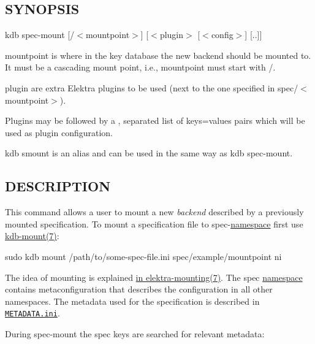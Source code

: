 \subsection*{S\+Y\+N\+O\+P\+S\+IS}

{\ttfamily kdb spec-\/mount \mbox{[}/$<$mountpoint$>$\mbox{]} \mbox{[}$<$plugin$>$ \mbox{[}$<$config$>$\mbox{]} \mbox{[}..\mbox{]}\mbox{]}}


\begin{DoxyItemize}
\item {\ttfamily mountpoint} is where in the key database the new backend should be mounted to. It must be a cascading mount point, i.\+e., {\ttfamily mountpoint} must start with {\ttfamily /}.
\item {\ttfamily plugin} are extra Elektra plugins to be used (next to the one specified in {\ttfamily spec/$<$mountpoint$>$}).
\item Plugins may be followed by a {\ttfamily ,} separated list of {\ttfamily keys=values} pairs which will be used as plugin configuration.
\end{DoxyItemize}

{\ttfamily kdb smount} is an alias and can be used in the same way as {\ttfamily kdb spec-\/mount}.

\subsection*{D\+E\+S\+C\+R\+I\+P\+T\+I\+ON}

This command allows a user to mount a new {\itshape backend} described by a previously mounted specification. To mount a specification file to {\ttfamily spec}-\/\hyperlink{doc_help_elektra-namespaces_md}{namespace} first use \hyperlink{doc_help_kdb-mount_md}{kdb-\/mount(7)}\+:


\begin{DoxyCode}
sudo kdb mount /path/to/some-spec-file.ini spec/example/mountpoint ni
\end{DoxyCode}


The idea of mounting is explained \hyperlink{doc_help_elektra-mounting_md}{in elektra-\/mounting(7)}. The {\ttfamily spec} \hyperlink{doc_help_elektra-namespaces_md}{namespace} contains metaconfiguration that describes the configuration in all other namespaces. The metadata used for the specification is described in \href{/home/markus/Projekte/Elektra/current/doc/METADATA.ini}{\tt M\+E\+T\+A\+D\+A\+T\+A.\+ini}.

During {\ttfamily spec-\/mount} the {\ttfamily spec} keys are searched for relevant metadata\+:


